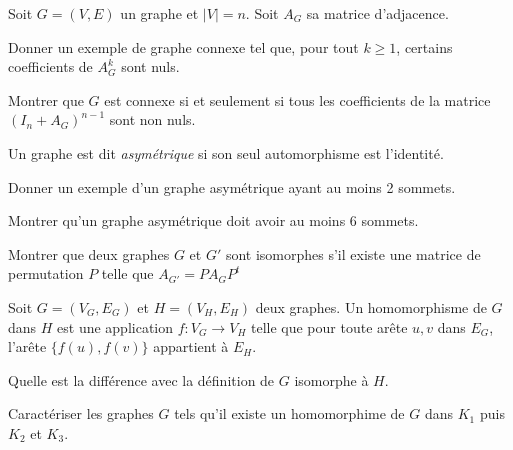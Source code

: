 \documentclass[french]{report}
\begin{document}
\begin{exo}
    Soit \(G=(V,E)\) un graphe et \(|V|=n\). Soit \(A_G\) sa matrice d'adjacence.
    \begin{q}{1}
        Donner un exemple de graphe connexe tel que, pour tout \(k\geq 1\), certains
        coefficients de \(A_G^k\) sont nuls.
    \end{q}
    \begin{q}{2}
        Montrer que \(G\) est connexe si et seulement si tous les coefficients
        de la matrice \(\left(I_n+A_G\right)^{n-1}\) sont non nuls.
    \end{q}
\end{exo}

\begin{exo}
    Un graphe est dit \textit{asymétrique} si son seul automorphisme est l'identité.
    \begin{q}{1}
        Donner un exemple d'un graphe asymétrique ayant au moins 2 sommets.
    \end{q}
    \begin{q}{2}
        Montrer qu'un graphe asymétrique doit avoir au moins \(6\) sommets.
    \end{q}
\end{exo}

\begin{exo}
    Montrer que deux graphes \(G\) et \(G'\) sont isomorphes s'il existe une
    matrice de permutation \(P\) telle que \(A_{G'}=PA_GP^t\)
\end{exo}

\begin{exo}
    Soit \(G=\left(V_G,E_G\right)\) et \(H=\left(V_H,E_H\right)\) deux graphes.
    Un homomorphisme de \(G\) dans \(H\) est une application \(f:V_G\to V_H\)
    telle que pour toute arête \({u,v}\) dans \(E_G\), l'arête \(\{f(u),f(v)\}\)
    appartient à \(E_H\).
    \begin{q}{1}
        Quelle est la différence avec la définition de \(G\) isomorphe à \(H\).
    \end{q}
    \begin{q}{2}
        Caractériser les graphes \(G\) tels qu'il existe un homomorphime de \(G\)
        dans \(K_1\) puis \(K_2\) et \(K_3\).
    \end{q}
\end{exo}
\end{document}
